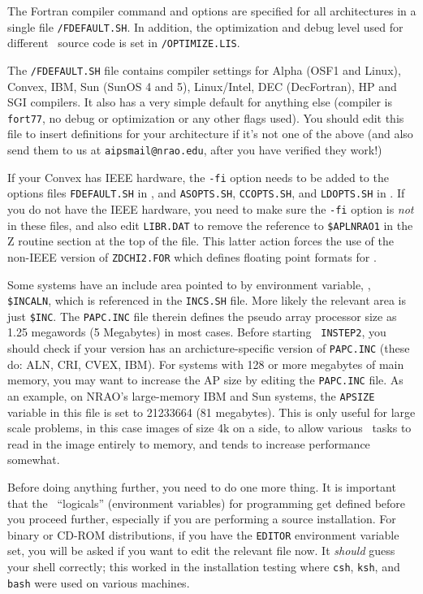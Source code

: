 The Fortran compiler command and options are specified for all
architectures in a single file {\tt \SYSU/FDEFAULT.SH}.  In addition,
the optimization and debug level used for different \AIPS\ source code
is set in {\tt\SYSU/OPTIMIZE.LIS}.

The {\tt \SYSU/FDEFAULT.SH} file contains compiler settings for Alpha
(OSF1 and Linux), Convex, IBM, Sun (SunOS 4 and 5), Linux/Intel, DEC
(DecFortran), HP and SGI compilers.  It also has a very simple default
for anything else (compiler is {\tt fort77}, no debug or optimization or
any other flags used).  You should edit this file to insert definitions
for your architecture if it's not one of the above (and also send them
to us at {\tt aipsmail@nrao.edu}, after you have verified they work!)

If your Convex has IEEE hardware, the {\tt -fi} option needs to be added
to the options files {\tt FDEFAULT.SH} in \SYSU, and {\tt ASOPTS.SH},
{\tt CCOPTS.SH}, and {\tt LDOPTS.SH} in \SYSL.  If you do not have the
IEEE hardware, you need to make sure the {\tt -fi} option is {\it not\/}
in these files, and also edit {\tt LIBR.DAT} to remove the reference to
{\tt\$APLNRAO1}
in the Z routine section at the top of the file.  This latter action
forces the use of the non-IEEE version of {\tt ZDCHI2.FOR} which defines
floating point formats for \AIPS.

Some systems have an include area pointed to by environment variable,
\eg, {\tt\$INCALN},
which is referenced in the {\tt INCS.SH} file.  More likely the relevant
area is just {\tt\$INC}.
The {\tt PAPC.INC} file therein defines the pseudo array processor size
as 1.25 megawords (5 Megabytes) in most cases.  Before starting {\tt
INSTEP2}, you should check if your version has an archicture-specific
version of {\tt PAPC.INC} (these do: ALN, CRI, CVEX, IBM).  For systems
with 128 or more megabytes of main memory, you may want to increase the
AP size by editing the {\tt PAPC.INC} file.  As an example, on NRAO's
large-memory IBM and Sun systems, the {\tt APSIZE} variable in this file
is set to 21233664 (81 megabytes).  This is only useful for large scale
problems, in this case images of size 4k on a side, to allow various
\AIPS\ tasks to read in the image entirely to memory, and tends to
increase performance somewhat.

\medskip{}

Before doing anything further, you need to do one more thing.  It is
important that the \AIPS\ ``logicals'' (environment variables) for
programming get defined before you proceed further, especially if you
are performing a source installation.  For binary or CD-ROM
distributions, if you have the {\tt EDITOR} environment variable set,
you will be asked if you want to edit the relevant file now.  It {\it
should\/} guess your shell correctly; this worked in the installation
testing where {\tt csh}, {\tt ksh}, and {\tt bash} were used on various
machines.

